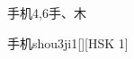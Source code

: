 \begin{entry}{手机}{4,6}{⼿、⽊}
  \begin{phonetics}{手机}{shou3ji1}[][HSK 1]
  \end{phonetics}
\end{entry}
